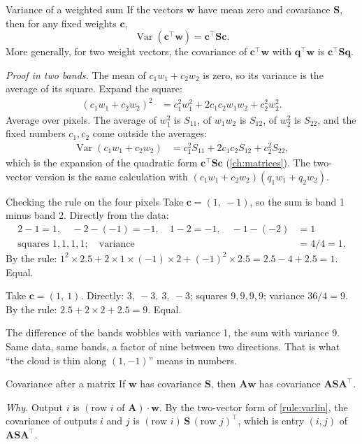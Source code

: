 \documentclass[11pt,a4paper,oneside,openany]{book}
\newcommand{\B}[1]{{\symbf{#1}}}
\newcommand{\B}[1]{{\bm{#1}}}
\newcommand{\T}{^{\top}}
\newcommand{\Var}{\operatorname{Var}}
\newcommand{\vw}{\B{w}}
\newcommand{\vc}{\B{c}}
\newcommand{\vq}{\B{q}}
\newcommand{\mS}{\B{S}}
\newcommand{\mA}{\B{A}}
\begin{document}
\begin{rulebox}[label=rule:varlin]{Variance of a weighted sum}
If the vectors $\vw$ have mean zero and covariance $\mS$, then for any fixed weights $\vc$,
\[
  \Var(\vc\T\vw)=\vc\T\mS\vc .
\]
More generally, for two weight vectors, the covariance of $\vc\T\vw$ with $\vq\T\vw$ is $\vc\T\mS\vq$.

\emph{Proof in two bands.} The mean of $c_1w_1+c_2w_2$ is zero, so its variance is the average of its square. Expand the
square:
\begin{align*}
(c_1w_1+c_2w_2)^2 &= c_1^2w_1^2+2c_1c_2w_1w_2+c_2^2w_2^2 .
\end{align*}
Average over pixels. The average of $w_1^2$ is $S_{11}$, of $w_1w_2$ is $S_{12}$, of $w_2^2$ is $S_{22}$, and the fixed
numbers $c_1,c_2$ come outside the averages:
\begin{align*}
\Var(c_1w_1+c_2w_2) &= c_1^2S_{11}+2c_1c_2S_{12}+c_2^2S_{22},
\end{align*}
which is the expansion of the quadratic form $\vc\T\mS\vc$ (\cref{ch:matrices}). The two-vector version is the same
calculation with $(c_1w_1+c_2w_2)(q_1w_1+q_2w_2)$.
\end{rulebox}

\begin{worked}[label=we:varlin]{Checking the rule on the four pixels}
Take $\vc=(1,\ -1)$, so the sum is band 1 minus band 2. Directly from the data:
\begin{align*}
2-1=1,\quad -2-(-1)=-1,\quad 1-2=-1,\quad -1-(-2)&=1\\
\text{squares } 1,1,1,1;\quad \text{variance} &= 4/4=1 .
\end{align*}
By the rule: $1^2\times2.5+2\times1\times(-1)\times2+(-1)^2\times2.5=2.5-4+2.5=1$. Equal.

Take $\vc=(1,\ 1)$. Directly: $3,\ -3,\ 3,\ -3$; squares $9,9,9,9$; variance $36/4=9$. By the rule:
$2.5+2\times2+2.5=9$. Equal.
\end{worked}

The difference of the bands wobbles with variance 1, the sum with variance 9. Same data, same bands, a factor of nine
between two directions. That is what ``the cloud is thin along $(1,-1)$'' means in numbers.

\begin{rulebox}[label=rule:covlin]{Covariance after a matrix}
If $\vw$ has covariance $\mS$, then $\mA\vw$ has covariance $\mA\mS\mA\T$.

\emph{Why.} Output $i$ is $(\text{row } i\text{ of }\mA)\cdot\vw$. By the two-vector form of \cref{rule:varlin}, the
covariance of outputs $i$ and $j$ is $(\text{row } i)\,\mS\,(\text{row } j)\T$, which is entry $(i,j)$ of $\mA\mS\mA\T$.
\end{rulebox}
\end{document}
